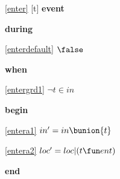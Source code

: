 \noindent \ref{enter} [t] \textbf{event}
\begin{block}
\item \textbf{during}
\begin{block}
\item[ \eqref{enterdefault} ]$\false $ %
\end{block}
\item \textbf{when}
\begin{block}
\item[ \eqref{entergrd1} ]$\neg t \in in	$ %
\end{block}
\item \textbf{begin}
\begin{block}
\item[ \eqref{entera1} ]$in' = in \bunion \{ t \}	$ %
\item[ \eqref{entera2} ]$loc' = loc | (t \fun ent)	$ %
\end{block}
\item \textbf{end} \\
\end{block}
